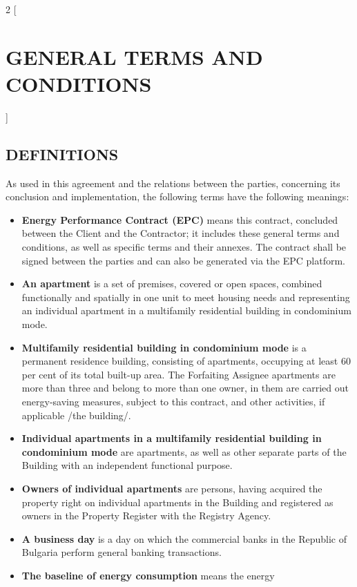 \begin{multicols}{2} [\section{GENERAL TERMS AND CONDITIONS}]

  \subsection{DEFINITIONS}
  As used in this agreement and the relations between the parties,
  concerning its conclusion and implementation, the following terms
  have the following meanings:
  \begin{itemize}[label={}]

  \item\textbf{Energy Performance Contract (EPC)} means this contract,
    concluded between the Client and the Contractor; it includes these
    general terms and conditions, as well as specific terms and their
    annexes. The contract shall be signed between the parties and can
    also be generated via the EPC platform.
  \item\textbf{An apartment} is a set of premises, covered or open
    spaces, combined functionally and spatially in one unit to meet
    housing needs and representing an individual apartment in a
    multifamily residential building in condominium mode.
  \item\textbf{Multifamily residential building in condominium mode}
    is a permanent residence building, consisting of apartments,
    occupying at least 60 per cent of its total built-up area. The
    Forfaiting Assignee apartments are more than three and belong to
    more than one owner, in them are carried out energy-saving
    measures, subject to this contract, and other activities, if
    applicable /the building/.
  \item\textbf{Individual apartments in a multifamily residential
      building in condominium mode} are apartments, as well as other
    separate parts of the Building with an independent functional
    purpose.
  \item\textbf{Owners of individual apartments} are persons, having
    acquired the property right on individual apartments in the
    Building and registered as owners in the Property Register with
    the Registry Agency.
  \item\textbf{A business day} is a day on which the commercial banks
    in the Republic of Bulgaria perform general banking transactions.
  \item\textbf{The baseline of energy consumption} means the energy

\end{itemize}
\end{multicols}
